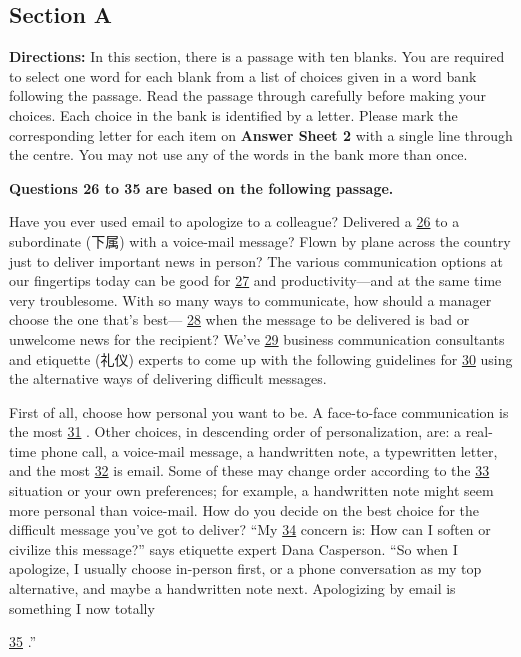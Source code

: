 \documentclass[UTF8,11pt]{ctexart}
\begin{document}
\subsection*{\textbf{Section A}}


\textbf{Directions:} In this section, there is a passage with ten blanks. You are required to select one word for each blank from a list of choices given in a word bank following the passage. Read the passage through carefully before making your choices. Each choice in the bank is identified by a letter. Please mark the corresponding letter for each item on\textbf{ Answer Sheet 2} with a single line through the centre. You may not use any of the words in the bank more than once.


\textbf{Questions 26 to 35 are based on the following passage.}


Have you ever used email to apologize to a colleague? Delivered a \uline{26} to a subordinate (下属) with a voice-mail message? Flown by plane across the country just to deliver important news in person? The various communication options at our fingertips today can be good for \uline{27} and productivity—and at the same time very troublesome. With so many ways to communicate, how should a manager choose the one that's best— \uline{28} when the message to be delivered is bad or unwelcome news for the recipient? We've \uline{29} business communication consultants and etiquette (礼仪) experts to come up with the following guidelines for \uline{30} using the alternative ways of delivering difficult messages.


First of all, choose how personal you want to be. A face-to-face communication is the most \uline{31} . Other choices, in descending order of personalization, are: a real-time phone call, a voice-mail message, a handwritten note, a typewritten letter, and the most \uline{32} is email. Some of these may change order according to the \uline{33} situation or your own preferences; for example, a handwritten note might seem more personal than voice-mail. How do you decide on the best choice for the difficult message you've got to deliver? “My \uline{34} concern is: How can I soften or civilize this message?” says etiquette expert Dana Casperson. “So when I apologize, I usually choose in-person first, or a phone conversation as my top alternative, and maybe a handwritten note next. Apologizing by email is something I now totally


\uline{35} .”
\end{document}
